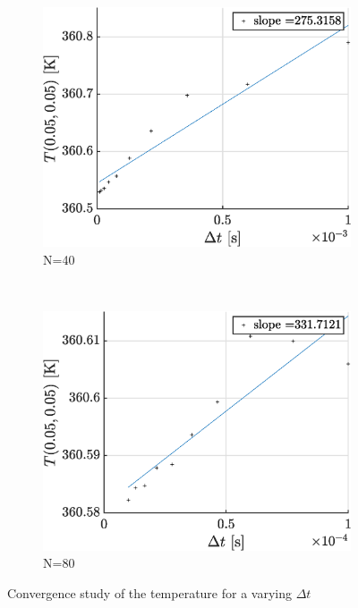 \documentclass[a4paper,12pt,twoside]{article}
\begin{document}
\begin{figure}[h]
  \centering
  \begin{subfigure}[t]{0.45\textwidth}
    \includegraphics[width=\textwidth]{graphs/b_conv40.eps}

    \caption{N=40}
    \label{fig:b-conv40}
  \end{subfigure}
  ~
  \begin{subfigure}[t]{0.45\textwidth}
    \includegraphics[width=\textwidth]{graphs/b_conv80.eps}
    \caption{N=80}
    \label{fig:b-conv80}
  \end{subfigure}
  \caption{Convergence study of the temperature for a varying $\Delta t$}
  \label{fig:bconv}
\end{figure}
\end{document}
